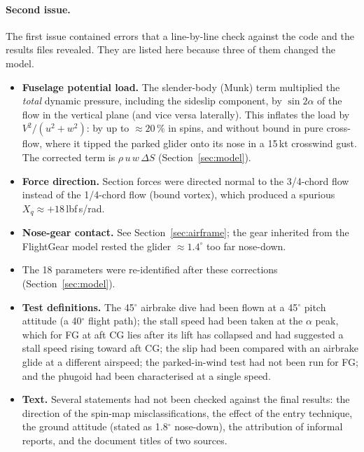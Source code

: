 \documentclass[10pt,a4paper,twocolumn]{article}
\newcommand{\FG}{FG}
\begin{document}
\paragraph{Second issue.} The first issue contained errors that a line-by-line check against the code and the results files revealed.
They are listed here because three of them changed the model.
\begin{itemize}
\item \textbf{Fuselage potential load.} The slender-body (Munk) term multiplied the \emph{total} dynamic pressure, including the
sideslip component, by $\sin2\alpha$ of the flow in the vertical plane (and vice versa laterally). This inflates the load by $V^2/(u^2+w^2)$:
by up to $\approx20\,\%$ in spins, and without bound in pure cross-flow, where it tipped the parked glider onto its nose in a 15\,kt
crosswind gust. The corrected term is $\rho\,u\,w\,\Delta S$ (Section~\ref{sec:model}).
\item \textbf{Force direction.} Section forces were directed normal to the 3/4-chord flow instead of the 1/4-chord flow (bound vortex),
which produced a spurious $X_q\approx+18$\,lbf\,s/rad.
\item \textbf{Nose-gear contact.} See Section~\ref{sec:airframe}; the gear inherited from the FlightGear model rested the glider $\approx1.4^\circ$ too far nose-down.
\item The 18 parameters were re-identified after these corrections (Section~\ref{sec:model}).
\item \textbf{Test definitions.} The 45$^\circ$ airbrake dive had been flown at a 45$^\circ$ pitch attitude (a 40$^\circ$ flight path); the
stall speed had been taken at the $\alpha$ peak, which for \FG{} at aft CG lies after its lift has collapsed and had suggested a stall speed
rising toward aft CG; the slip had been compared with an airbrake glide at a different airspeed; the parked-in-wind test had not been run
for \FG; and the phugoid had been characterised at a single speed.
\item \textbf{Text.} Several statements had not been checked against the final results: the direction of the spin-map misclassifications,
the effect of the entry technique, the ground attitude (stated as 1.8$^\circ$ nose-down), the attribution of informal reports, and the
document titles of two sources.
\end{itemize}

\end{document}
